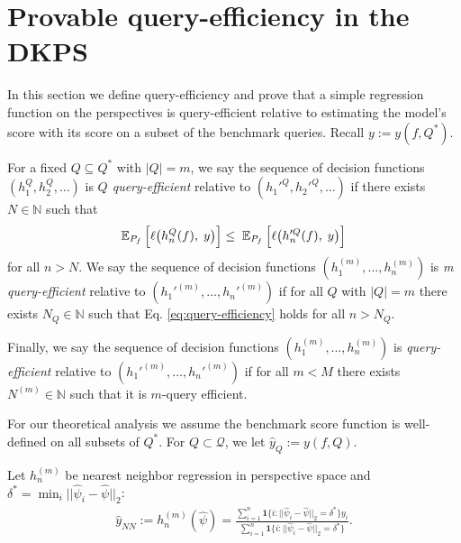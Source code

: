 
\section{Provable query-efficiency in the DKPS}
\label{sec:theory}
In this section we define query-efficiency and prove that a simple regression function on the perspectives is query-efficient relative to estimating the model's score with its score on a subset of the benchmark queries.
Recall $ y := y(f, Q^{*}) $.

For a fixed $ Q \subseteq Q^{*} $ with $ |Q | = m$, we say the sequence of decision functions $ (h_{1}^{Q}, h_{2}^{Q}, \hdots) $ is \textit{$Q $ query-efficient} relative to $ (h_{1}'^{Q}, h_{2}'^{Q}, \hdots) $ if there exists $ N \in \mathbb{N} $ such that
\begin{equation}
\label{eq:query-efficiency}
\small{
\mathbb{E}_{P_f}\,
\Big[\ell\big(h^{Q}_{n}(f),\; y\big)\Big]
\le\;
\mathbb{E}_{P_{f}}\,
\Big[\ell\big(h'^{Q}_{n}(f),\; y\big)\Big]
}
\end{equation}
for all $ n > N $. 
We say the sequence of decision functions $ (h_{1}^{(m)}, \hdots, h_{n}^{(m)}) $ is \textit{m query-efficient} relative to $ (h_{1}'^{(m)}, \hdots, h_{n}'^{(m)}) $ if for all $ Q $ with $ |Q | = m $ there exists $ N_{Q} \in \mathbb{N} $ such that Eq. \eqref{eq:query-efficiency} holds for all $ n > N_{Q} $.

Finally, we say the sequence of decision functions $ (h_{1}^{(m)}, \hdots, h_{n}^{(m)}) $ is \textit{query-efficient} relative to $ (h_{1}'^{(m)}, \hdots, h_{n}'^{(m)}) $ if for all $ m < M $ there exists $ N^{(m)} \in \mathbb{N} $ such that it is $ m $-query efficient.


For our theoretical analysis we assume the benchmark score function is well-defined on all subsets of $ Q^{*} $.
For $ Q \subset \mathcal{Q} $, we let $ \hat{y}_{Q} := y(f, Q) $.

Let $ h_{n}^{(m)} $ be nearest neighbor regression in perspective space and $ \delta^{*} = \min_{i} || \widehat{\psi}_{i} - \widehat{\psi}||_{2} $:
\small{
\begin{align*}
\hat{y}_{NN} := h^{(m)}_{n}(\widehat{\psi})
= \frac{\sum_{i=1}^n \mathbf{1}\{i: ||\widehat{\psi}_{i} - \widehat{\psi}||_{2} = \delta^{*} \}y_{i}}{\sum_{i=1}^n \mathbf{1}\{i: ||\widehat{\psi}_{i} - \widehat{\psi}||_{2} = \delta^{*}\}}.
\end{align*}
}

